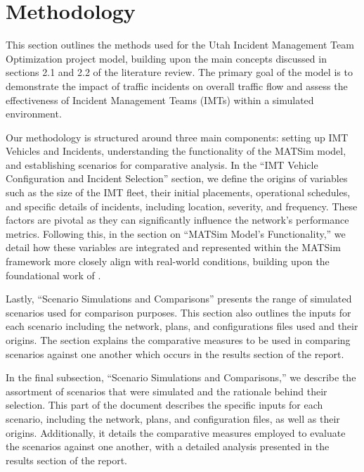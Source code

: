 \documentclass[
  letterpaper,
  authoryear]{elsarticle}
\begin{document}

\hypertarget{methodology}{%
\section{Methodology}\label{methodology}}

This section outlines the methods used for the Utah Incident Management
Team Optimization project model, building upon the main concepts
discussed in sections 2.1 and 2.2 of the literature review. The primary
goal of the model is to demonstrate the impact of traffic incidents on
overall traffic flow and assess the effectiveness of Incident Management
Teams (IMTs) within a simulated environment.

Our methodology is structured around three main components: setting up
IMT Vehicles and Incidents, understanding the functionality of the
MATSim model, and establishing scenarios for comparative analysis. In
the ``IMT Vehicle Configuration and Incident Selection'' section, we
define the origins of variables such as the size of the IMT fleet, their
initial placements, operational schedules, and specific details of
incidents, including location, severity, and frequency. These factors
are pivotal as they can significantly influence the network's
performance metrics. Following this, in the section on ``MATSim Model's
Functionality,'' we detail how these variables are integrated and
represented within the MATSim framework more closely align with
real-world conditions, building upon the foundational work of
\citet{kaddoura2018}.

Lastly, ``Scenario Simulations and Comparisons'' presents the range of
simulated scenarios used for comparison purposes. This section also
outlines the inputs for each scenario including the network, plans, and
configurations files used and their origins. The section explains the
comparative measures to be used in comparing scenarios against one
another which occurs in the results section of the report.

In the final subsection, ``Scenario Simulations and Comparisons,'' we
describe the assortment of scenarios that were simulated and the
rationale behind their selection. This part of the document describes
the specific inputs for each scenario, including the network, plans, and
configuration files, as well as their origins. Additionally, it details
the comparative measures employed to evaluate the scenarios against one
another, with a detailed analysis presented in the results section of
the report.
\end{document}
